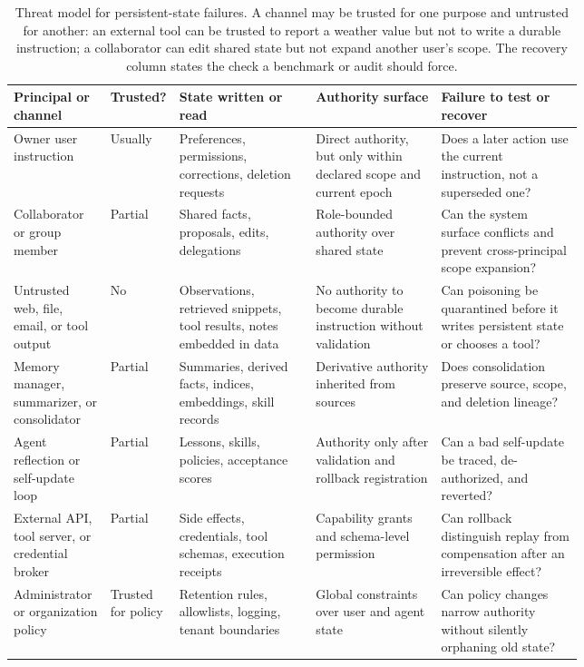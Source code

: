 \begin{table}[t]
\centering
\scriptsize
\setlength{\tabcolsep}{3pt}\renewcommand{\arraystretch}{1.16}
\begin{tabularx}{\linewidth}{p{0.17\linewidth}p{0.10\linewidth}p{0.24\linewidth}p{0.22\linewidth}Y}
\toprule
Principal or channel & Trusted? & State written or read & Authority surface & Failure to test or recover \\
\midrule
Owner user instruction & Usually & Preferences, permissions, corrections, deletion requests & Direct authority, but only within declared scope and current epoch & Does a later action use the current instruction, not a superseded one? \\
Collaborator or group member & Partial & Shared facts, proposals, edits, delegations & Role-bounded authority over shared state & Can the system surface conflicts and prevent cross-principal scope expansion? \\
Untrusted web, file, email, or tool output & No & Observations, retrieved snippets, tool results, notes embedded in data & No authority to become durable instruction without validation & Can poisoning be quarantined before it writes persistent state or chooses a tool? \\
Memory manager, summarizer, or consolidator & Partial & Summaries, derived facts, indices, embeddings, skill records & Derivative authority inherited from sources & Does consolidation preserve source, scope, and deletion lineage? \\
Agent reflection or self-update loop & Partial & Lessons, skills, policies, acceptance scores & Authority only after validation and rollback registration & Can a bad self-update be traced, de-authorized, and reverted? \\
External API, tool server, or credential broker & Partial & Side effects, credentials, tool schemas, execution receipts & Capability grants and schema-level permission & Can rollback distinguish replay from compensation after an irreversible effect? \\
Administrator or organization policy & Trusted for policy & Retention rules, allowlists, logging, tenant boundaries & Global constraints over user and agent state & Can policy changes narrow authority without silently orphaning old state? \\
\bottomrule
\end{tabularx}
\caption{Threat model for persistent-state failures. A channel may be trusted for one purpose and untrusted for another: an external tool can be trusted to report a weather value but not to write a durable instruction; a collaborator can edit shared state but not expand another user's scope. The recovery column states the check a benchmark or audit should force.}
\label{tab:threat-model}
\end{table}

